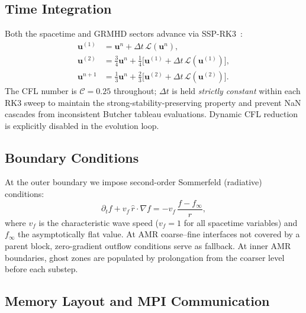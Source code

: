 \documentclass[aps,prd,twocolumn,superscriptaddress,nofootinbib,showpacs,
               longbibliography]{revtex4-2}
\begin{document}
\subsection{Time Integration}
\label{sec:rk3}

Both the spacetime and GRMHD sectors advance via SSP-RK3~\cite{ShuOsher1988}:
\begin{align}
  \mathbf{u}^{(1)} &= \mathbf{u}^n + \Delta t\,\mathcal{L}(\mathbf{u}^n), \\
  \mathbf{u}^{(2)} &= \tfrac{3}{4}\mathbf{u}^n
                   + \tfrac{1}{4}\bigl[\mathbf{u}^{(1)}
                   + \Delta t\,\mathcal{L}(\mathbf{u}^{(1)})\bigr], \\
  \mathbf{u}^{n+1} &= \tfrac{1}{3}\mathbf{u}^n
                   + \tfrac{2}{3}\bigl[\mathbf{u}^{(2)}
                   + \Delta t\,\mathcal{L}(\mathbf{u}^{(2)})\bigr].
\end{align}
The CFL number is $\mathcal{C} = 0.25$ throughout; $\Delta t$ is held
\emph{strictly constant} within each RK3 sweep to maintain the
strong-stability-preserving property and prevent NaN cascades from
inconsistent Butcher tableau evaluations.
Dynamic CFL reduction is explicitly disabled in the evolution loop.

\subsection{Boundary Conditions}
\label{sec:bc}

At the outer boundary we impose second-order Sommerfeld (radiative)
conditions:
\begin{equation}
  \partial_t f + v_f\,\hat{r}\cdot\nabla f = -v_f\,\frac{f - f_\infty}{r},
\end{equation}
where $v_f$ is the characteristic wave speed ($v_f = 1$ for all spacetime
variables) and $f_\infty$ the asymptotically flat value.
At AMR coarse--fine interfaces not covered by a parent block, zero-gradient
outflow conditions serve as fallback.
At inner AMR boundaries, ghost zones are populated by prolongation from the
coarser level before each substep.

\subsection{Memory Layout and MPI Communication}
\label{sec:memory}
\end{document}

